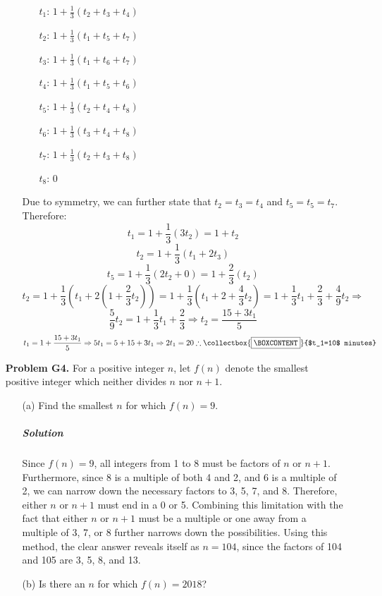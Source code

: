 \documentclass[10pt,a4paper]{article}
\newcommand{\mybox}{%
	\collectbox{%
		\setlength{\fboxsep}{3pt}%
		\fbox{\BOXCONTENT}%
	}%
}
\begin{document}
\begin{itemize}
\begin{enumerate}
			\begin{itemize}
				\item[$t_1$:] 
				$1 + \frac{1}{3}(t_2+t_3+t_4)$
				\item[$t_2$:] 
				$1 + \frac{1}{3}(t_1+t_5+t_7)$
				\item[$t_3$:] 
				$1 + \frac{1}{3}(t_1+t_6+t_7)$
				\item[$t_4$:] 
				$1 + \frac{1}{3}(t_1+t_5+t_6)$
				\item[$t_5$:] 
				$1 + \frac{1}{3}(t_2+t_4+t_8)$
				\item[$t_6$:] 
				$1 + \frac{1}{3}(t_3+t_4+t_8)$
				\item[$t_7$:] 
				$1 + \frac{1}{3}(t_2+t_3+t_8)$
				\item[$t_8$:] 
				$0$
			\end{itemize}
		
			Due to symmetry, we can further state that $t_2=t_3=t_4$ and $t_5=t_5=t_7$. Therefore:
			\[ t_1=1+\frac{1}{3}(3t_2)=1+t_2 \]
			\[ t_2=1+\frac{1}{3}(t_1+2t_3) \]
			\[ t_5=1+\frac{1}{3}(2t_2+0)=1+\frac{2}{3}(t_2) \]
			\[ t_2=1+\frac{1}{3}(t_1+2(1+\frac{2}{3}t_2))=1+\frac{1}{3}(t_1+2+\frac{4}{3}t_2)=1+\frac{1}{3}t_1+\frac{2}{3}+\frac{4}{9}t_2\Rightarrow \]
			\[ \frac{5}{9}t_2=1+\frac{1}{3}t_1+\frac{2}{3}\Rightarrow t_2=\frac{15+3t_1}{5} \]
			\[ t_1=1+\frac{15+3t_1}{5}\Rightarrow 5t_1=5+15+3t_1\Rightarrow 2t_1=20\therefore \mybox{$t_1=10$ minutes} \]
		\end{enumerate}
	
		\item[\textbf{Problem G4.}] For a positive integer $n$, let $f(n)$ denote the smallest positive integer which neither divides $n$ nor $n+1$.
		
		\begin{enumerate}
			\item[(a)] Find the smallest $n$ for which $f(n)=9$.
			
			\subparagraph{Solution} Since $f(n)=9$, all integers from 1 to 8 must be factors of $n$ or $n+1$. Furthermore, since 8 is a multiple of both 4 and 2, and 6 is a multiple of 2, we can narrow down the necessary factors to 3, 5, 7, and 8. Therefore, either $n$ or $n+1$ must end in a 0 or 5. Combining this limitation with the fact that either $n$ or $n+1$ must be a multiple or one away from a multiple of 3, 7, or 8 further narrows down the possibilities. Using this method, the clear answer reveals itself as \mybox{$n=104$}, since the factors of 104 and 105 are 3, 5, 8, and 13.
			
			\item[(b)] Is there an $n$ for which $f(n)=2018$?
			

\end{enumerate}
\end{itemize}
\end{document}
